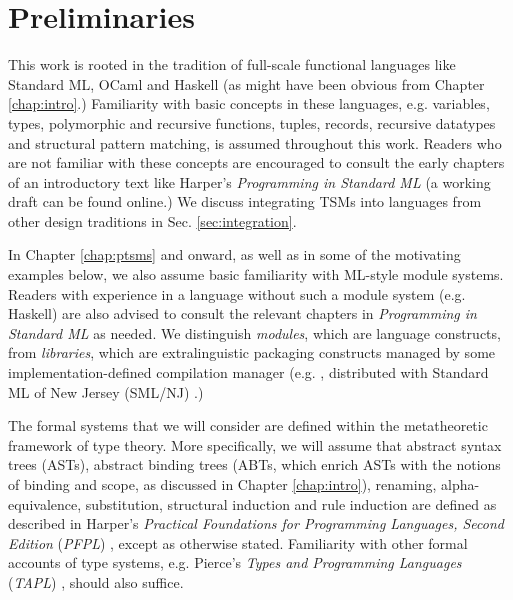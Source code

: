
\section{Preliminaries}\label{sec:preliminaries}
\vspace{-3px}
This work is rooted in the tradition of full-scale functional languages like Standard ML, OCaml and Haskell (as might have been obvious from Chapter \ref{chap:intro}.) Familiarity with basic concepts in these languages, e.g. variables, types, polymorphic and recursive functions, tuples, records, recursive datatypes and structural pattern matching, is assumed throughout this work. Readers who are not familiar with these concepts are encouraged to consult the early chapters of an introductory text like Harper's \emph{Programming in Standard ML} \cite{harper1997programming} (a working draft can be found online.) We discuss integrating TSMs into languages from other design traditions in Sec. \ref{sec:integration}.

In Chapter \ref{chap:ptsms} and onward, as well as in some of the motivating examples below, we also assume basic familiarity with ML-style module systems. Readers with experience in a language without such a module system (e.g. Haskell) are also advised to consult the relevant chapters in \emph{Programming in Standard ML} \cite{harper1997programming} as needed. We distinguish \emph{modules}, which are language constructs, from \emph{libraries}, which are extralinguistic packaging constructs managed by some implementation-defined compilation manager (e.g. , distributed with Standard ML of New Jersey (SML/NJ) \cite{DBLP:conf/plilp/AppelM91}.)

The formal systems that we will consider are defined within the metatheoretic framework of type theory. More specifically, we will assume that abstract syntax trees (ASTs), abstract binding trees (ABTs, which enrich ASTs with the notions of binding and scope, as discussed in Chapter \ref{chap:intro}), renaming, alpha-equivalence, substitution, structural induction and rule induction are defined as described in Harper's \emph{Practical Foundations for Programming Languages, Second Edition} (\emph{PFPL}) \cite{pfpl}, except as otherwise stated. Familiarity with other formal accounts of type systems, e.g. Pierce's \emph{Types and Programming Languages} (\emph{TAPL}) \cite{tapl}, should also suffice.%

